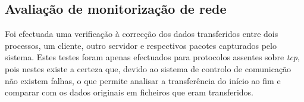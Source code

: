 %
%
%

\subsection{Avaliação de monitorização de rede}

Foi efectuada uma verificação à correcção dos dados transferidos entre dois processos, um cliente, outro servidor e respectivos pacotes capturados pelo sistema.
Estes testes foram apenas efectuados para protocolos assentes sobre \textit{tcp}, pois nestes existe a certeza que, devido ao sistema de controlo de comunicação não existem falhas, o que permite analisar a transferência do início ao fim e comparar com os dados originais em ficheiros que eram transferidos.

